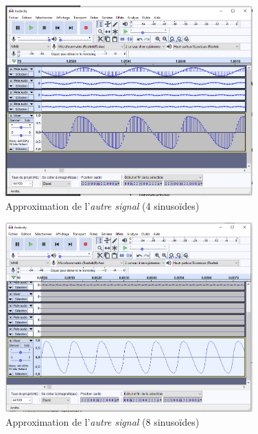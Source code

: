 \documentclass[a4paper]{article}
\begin{document}

\begin{figure}[H]
    \centering
    \includegraphics[width=0.85\textwidth]{images/AutreSignal002.PNG}
    \caption{Approximation de l'\textit{autre signal} (4 sinusoïdes)}
    \label{fig:AutreSignal002}
\end{figure}

\begin{figure}[H]
    \centering
    \includegraphics[width=0.85\textwidth]{images/AutreSignal005.PNG}
    \caption{Approximation de l'\textit{autre signal} (8 sinusoïdes)}
    \label{fig:AutreSignal005}
\end{figure}
\end{document}
